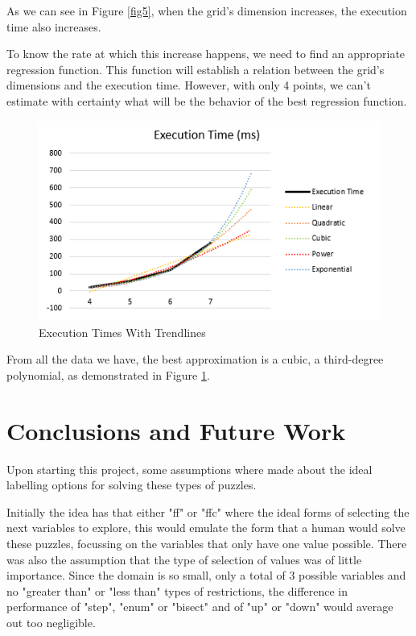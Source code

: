 \documentclass[runningheads]{llncs}
\begin{document}
As we can see in Figure \ref{fig5}, when the grid's dimension increases,
    the execution time also increases.

To know the rate at which this increase happens, we need to find an appropriate regression function.
This function will establish a relation between the grid's dimensions and the execution time.
However, with only 4 points, we can't estimate with certainty what will be the behavior
    of the best regression function.

\begin{figure} [h]
    \centering
    \includegraphics[scale=0.6]{img/dimensional_prediction.png}
    \caption{Execution Times With Trendlines} \label{fig6}
\end{figure}

From all the data we have, the best approximation is a cubic, a third-degree polynomial,
    as demonstrated in Figure \ref{fig6}.

\section{Conclusions and Future Work}
Upon starting this project, some assumptions where made about the ideal labelling options
for solving these types of puzzles.

Initially the idea has that either "ff" or "ffc" where the ideal forms of selecting the
next variables to explore, this would emulate the form that a human would solve these puzzles,
focussing on the variables that only have one value possible.
There was also the assumption that the type of selection of values was of little importance.
Since the domain is so small, only a total of 3 possible variables and no "greater than" or 
"less than" types of restrictions, the difference in performance of "step", "enum" or "bisect"
and of "up" or "down" would average out too negligible.
\end{document}
